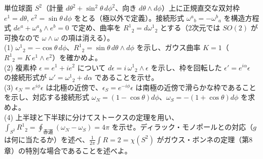 \begin{problem}[難易度 B]\label{ch05-prob-gb}
単位球面 $S^2$（計量 $d\theta^2+\sin^2\theta\,d\phi^2$、向き $d\theta\wedge d\phi$）上に正規直交な双対枠 $e^1=d\theta$, $e^2=\sin\theta\,d\phi$ をとる（極以外で定義）。接続形式 $\omega^a{}_b=-\omega^b{}_a$ を構造方程式 $de^a+\omega^a{}_b\wedge e^b=0$ で定め、曲率を $R^1{}_2=d\omega^1{}_2$ とする（2次元では $SO(2)$ が可換なので $\omega\wedge\omega$ の項は消える）。\\
(1) $\omega^1{}_2=-\cos\theta\,d\phi$、$R^1{}_2=\sin\theta\,d\theta\wedge d\phi$ を示し、ガウス曲率 $K=1$（$R^1{}_2=K\,e^1\wedge e^2$）を確かめよ。\\
(2) 複素枠 $\epsilon=e^1+ie^2$ について $d\epsilon=i\,\omega^1{}_2\wedge\epsilon$ を示し、枠を回転した $\epsilon'=e^{i\alpha}\epsilon$ の接続形式が $\omega'=\omega^1{}_2+d\alpha$ であることを示せ。\\
(3) $\epsilon_N=e^{i\phi}\epsilon$ は北極の近傍で、$\epsilon_S=e^{-i\phi}\epsilon$ は南極の近傍で滑らかな枠であることを示し、対応する接続形式 $\omega_N=(1-\cos\theta)d\phi$、$\omega_S=-(1+\cos\theta)d\phi$ を求めよ。\\
(4) 上半球と下半球に分けてストークスの定理を用い、$\int_{S^2}R^1{}_2=\oint_{\text{赤道}}(\omega_N-\omega_S)=4\pi$ を示せ。ディラック・モノポールとの対応（$g$ は何に当たるか）を述べ、$\frac1{2\pi}\int R=2=\chi(S^2)$ がガウス・ボンネの定理（第8章）の特別な場合であることを述べよ。
\end{problem}

